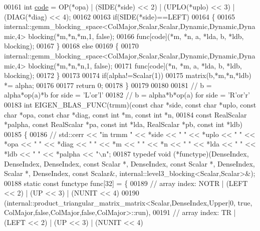 \begin{DoxyCode}
00161   \textcolor{keywordtype}{int} \hyperlink{structcode}{code} = OP(*opa) | (SIDE(*side) << 2) | (UPLO(*uplo) << 3) | (DIAG(*diag) << 4);
00162 
00163   \textcolor{keywordflow}{if}(SIDE(*side)==LEFT)
00164   \{
00165     internal::gemm\_blocking\_space<ColMajor,Scalar,Scalar,Dynamic,Dynamic,Dynamic,4> blocking(*m,*n,*m,1,\textcolor{keyword}{
      false});
00166     func[code](*m, *n, a, *lda, b, *ldb, blocking);
00167   \}
00168   \textcolor{keywordflow}{else}
00169   \{
00170     internal::gemm\_blocking\_space<ColMajor,Scalar,Scalar,Dynamic,Dynamic,Dynamic,4> blocking(*m,*n,*n,1,\textcolor{keyword}{
      false});
00171     func[code](*n, *m, a, *lda, b, *ldb, blocking);
00172   \}
00173 
00174   \textcolor{keywordflow}{if}(alpha!=Scalar(1))
00175     matrix(b,*m,*n,*ldb) *= alpha;
00176 
00177   \textcolor{keywordflow}{return} 0;
00178 \}
00179 
00180 
00181 \textcolor{comment}{// b = alpha*op(a)*b  for side = 'L'or'l'}
00182 \textcolor{comment}{// b = alpha*b*op(a)  for side = 'R'or'r'}
00183 \textcolor{keywordtype}{int} EIGEN\_BLAS\_FUNC(trmm)(\textcolor{keyword}{const} \textcolor{keywordtype}{char} *side, \textcolor{keyword}{const} \textcolor{keywordtype}{char} *uplo, \textcolor{keyword}{const} \textcolor{keywordtype}{char} *opa, \textcolor{keyword}{const} \textcolor{keywordtype}{char} *diag, \textcolor{keyword}{const} \textcolor{keywordtype}{int} 
      *m, \textcolor{keyword}{const} \textcolor{keywordtype}{int} *n,
00184                           \textcolor{keyword}{const} RealScalar *palpha, \textcolor{keyword}{const} RealScalar *pa, \textcolor{keyword}{const} \textcolor{keywordtype}{int} *lda, RealScalar *pb, \textcolor{keyword}{
      const} \textcolor{keywordtype}{int} *ldb)
00185 \{
00186 \textcolor{comment}{//   std::cerr << "in trmm " << *side << " " << *uplo << " " << *opa << " " << *diag << " " << *m << " " <<
       *n << " " << *lda << " " << *ldb << " " << *palpha << "\(\backslash\)n";}
00187   \textcolor{keyword}{typedef} void (*functype)(DenseIndex, DenseIndex, DenseIndex, \textcolor{keyword}{const} Scalar *, DenseIndex, \textcolor{keyword}{const} Scalar *, 
      DenseIndex, Scalar *, DenseIndex, \textcolor{keyword}{const} Scalar&, internal::level3\_blocking<Scalar,Scalar>&);
00188   \textcolor{keyword}{static} \textcolor{keyword}{const} functype func[32] = \{
00189     \textcolor{comment}{// array index: NOTR  | (LEFT  << 2) | (UP << 3) | (NUNIT << 4)}
00190     (internal::product\_triangular\_matrix\_matrix<Scalar,DenseIndex,Upper|0,          true,
       ColMajor,false,ColMajor,false,ColMajor>::run),
00191     \textcolor{comment}{// array index: TR    | (LEFT  << 2) | (UP << 3) | (NUNIT << 4)}

\end{DoxyCode}
